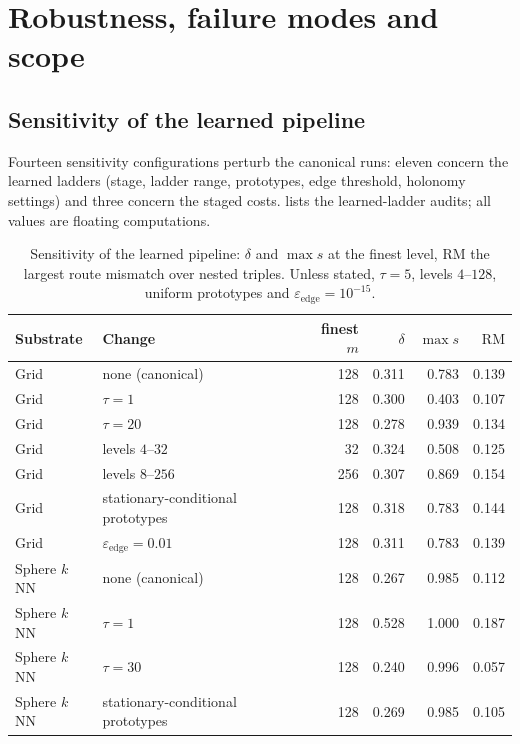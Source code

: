 \documentclass[11pt]{article}
\newcommand{\RM}{\mathrm{RM}}
\begin{document}
 \section{Robustness, failure modes and scope}
\label{sec:limits}

\subsection{Sensitivity of the learned pipeline}

Fourteen sensitivity configurations perturb the canonical runs: eleven concern the learned ladders (stage, ladder range, prototypes, edge threshold, holonomy settings) and three concern the staged costs.
 lists the learned-ladder audits; all values are floating computations.

\begin{table}[t]
\centering
\small
\caption{Sensitivity of the learned pipeline: $\delta$ and $\max s$ at the finest level, $\RM$ the largest route mismatch over nested triples. Unless stated, $\tau=5$, levels $4$--$128$, uniform prototypes and $\varepsilon_{\mathrm{edge}}=10^{-15}$.}
\label{tab:sweeps}
\begin{tabular}{@{}llrrrr@{}}
\toprule
Substrate & Change & finest $m$ & $\delta$ & $\max s$ & $\RM$ \\
\midrule
Grid & none (canonical) & 128 & 0.311 & 0.783 & 0.139 \\
Grid & $\tau=1$ & 128 & 0.300 & 0.403 & 0.107 \\
Grid & $\tau=20$ & 128 & 0.278 & 0.939 & 0.134 \\
Grid & levels $4$--$32$ & 32 & 0.324 & 0.508 & 0.125 \\
Grid & levels $8$--$256$ & 256 & 0.307 & 0.869 & 0.154 \\
Grid & stationary-conditional prototypes & 128 & 0.318 & 0.783 & 0.144 \\
Grid & $\varepsilon_{\mathrm{edge}}=0.01$ & 128 & 0.311 & 0.783 & 0.139 \\
Sphere $k$NN & none (canonical) & 128 & 0.267 & 0.985 & 0.112 \\
Sphere $k$NN & $\tau=1$ & 128 & 0.528 & 1.000 & 0.187 \\
Sphere $k$NN & $\tau=30$ & 128 & 0.240 & 0.996 & 0.057 \\
Sphere $k$NN & stationary-conditional prototypes & 128 & 0.269 & 0.985 & 0.105 \\
\bottomrule
\end{tabular}
\end{table}
\end{document}
